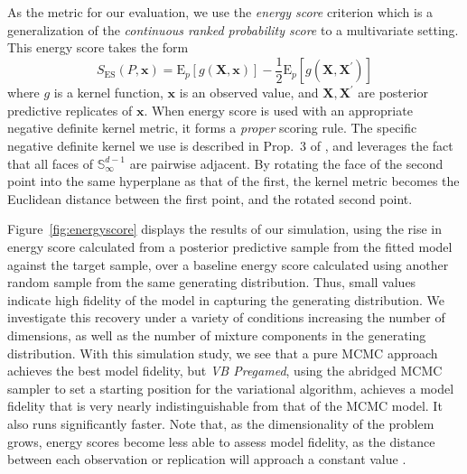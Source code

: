 As the metric for our evaluation, we use the \emph{energy score} criterion \citep{gneiting2007}
    which is a generalization of the \emph{continuous ranked probability score} to a multivariate
    setting.  This energy score takes the form
    \[
      S_{\text{ES}}(P, \bm{x}) = \text{E}_p\left[g(\bm{X},\bm{x})\right] - 
        \frac{1}{2}\text{E}_p\left[g(\bm{X},\bm{X}^{\prime})\right]
    \]
    where $g$ is a kernel function, $\bm{x}$ is an observed value, and 
    $\bm{X},\bm{X}^{\prime}$ are posterior predictive replicates of $\bm{x}$.
    When energy score is used with an appropriate negative definite kernel 
    metric, it forms a \emph{proper} scoring rule. The specific negative 
    definite kernel we use is described in Prop.~3 of \cite{trubey:pg}, 
    and leverages the fact that all faces of $\mathbb{S}_{\infty}^{d-1}$
    are pairwise adjacent.  By rotating the face of the second point into 
    the same hyperplane as that of the first, the kernel metric becomes the Euclidean 
    distance between the first point, and the rotated second point.
    
Figure~\ref{fig:energyscore} displays the results of our simulation, using the rise in energy score 
    calculated from a posterior predictive sample from the fitted model against the target 
    sample, over a baseline energy score calculated using another random sample from the same 
    generating distribution.  Thus, small values indicate high fidelity of the model in 
    capturing the generating distribution. We investigate this recovery under a variety of 
    conditions increasing the number of dimensions, as well as the number of mixture components 
    in the generating distribution. With this simulation study, we see that
    a pure MCMC approach achieves the best model fidelity, but \emph{VB Pregamed}, using 
    the abridged MCMC sampler to set a starting position for the variational algorithm, 
    achieves a model fidelity that is very nearly indistinguishable from that of the 
    MCMC model.  It also runs significantly faster.
    Note that, as the dimensionality of the problem grows, energy scores become less able to 
    assess model fidelity, as the distance between each observation or replication will approach 
    a constant value \citep{bishop2006}.
    

